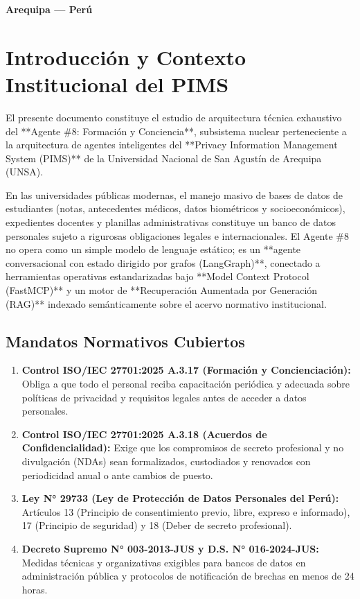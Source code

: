 \documentclass[11pt,a4paper]{article}
\begin{document}
\begin{titlepage}
    \vfill
    {\large\bfseries Arequipa — Perú \par}
\end{titlepage}

\newpage
\tableofcontents
\newpage

\section{Introducción y Contexto Institucional del PIMS}

El presente documento constituye el estudio de arquitectura técnica exhaustivo del **Agente \#8: Formación y Conciencia**, subsistema nuclear perteneciente a la arquitectura de agentes inteligentes del **Privacy Information Management System (PIMS)** de la Universidad Nacional de San Agustín de Arequipa (UNSA).

En las universidades públicas modernas, el manejo masivo de bases de datos de estudiantes (notas, antecedentes médicos, datos biométricos y socioeconómicos), expedientes docentes y planillas administrativas constituye un banco de datos personales sujeto a rigurosas obligaciones legales e internacionales. El Agente \#8 no opera como un simple modelo de lenguaje estático; es un **agente conversacional con estado dirigido por grafos (LangGraph)**, conectado a herramientas operativas estandarizadas bajo **Model Context Protocol (FastMCP)** y un motor de **Recuperación Aumentada por Generación (RAG)** indexado semánticamente sobre el acervo normativo institucional.

\subsection{Mandatos Normativos Cubiertos}
\begin{enumerate}
    \item \textbf{Control ISO/IEC 27701:2025 A.3.17 (Formación y Concienciación):} Obliga a que todo el personal reciba capacitación periódica y adecuada sobre políticas de privacidad y requisitos legales antes de acceder a datos personales.
    \item \textbf{Control ISO/IEC 27701:2025 A.3.18 (Acuerdos de Confidencialidad):} Exige que los compromisos de secreto profesional y no divulgación (NDAs) sean formalizados, custodiados y renovados con periodicidad anual o ante cambios de puesto.
    \item \textbf{Ley N° 29733 (Ley de Protección de Datos Personales del Perú):} Artículos 13 (Principio de consentimiento previo, libre, expreso e informado), 17 (Principio de seguridad) y 18 (Deber de secreto profesional).
    \item \textbf{Decreto Supremo N° 003-2013-JUS y D.S. N° 016-2024-JUS:} Medidas técnicas y organizativas exigibles para bancos de datos en administración pública y protocolos de notificación de brechas en menos de 24 horas.
\end{enumerate}
\end{document}
